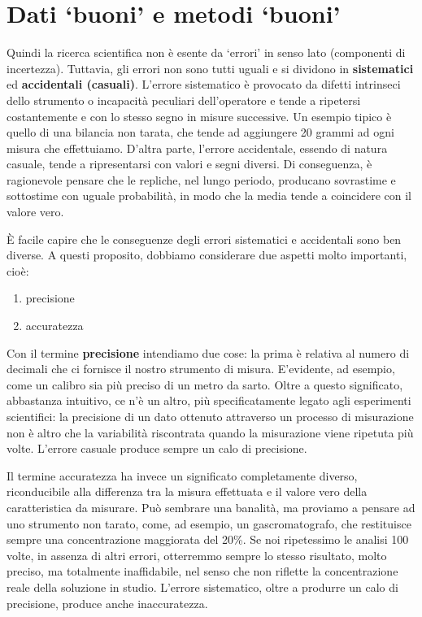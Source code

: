 \documentclass[a4paper,12pt,oneside]{book}
\providecommand{\tightlist}{%
  \setlength{\itemsep}{0pt}\setlength{\parskip}{0pt}}
\begin{document}
\hypertarget{dati-buoni-e-metodi-buoni}{%
\section{Dati `buoni' e metodi `buoni'}\label{dati-buoni-e-metodi-buoni}}

Quindi la ricerca scientifica non è esente da `errori' in senso lato (componenti di incertezza). Tuttavia, gli errori non sono tutti uguali e si dividono in \textbf{sistematici} ed \textbf{accidentali (casuali)}. L'errore sistematico è provocato da difetti intrinseci dello strumento o incapacità peculiari dell'operatore e tende a ripetersi costantemente e con lo stesso segno in misure successive. Un esempio tipico è quello di una bilancia non tarata, che tende ad aggiungere 20 grammi ad ogni misura che effettuiamo. D'altra parte, l'errore accidentale, essendo di natura casuale, tende a ripresentarsi con valori e segni diversi. Di conseguenza, è ragionevole pensare che le repliche, nel lungo periodo, producano sovrastime e sottostime con uguale probabilità, in modo che la media tende a coincidere con il valore vero.

È facile capire che le conseguenze degli errori sistematici e accidentali sono ben diverse. A questi proposito, dobbiamo considerare due aspetti molto importanti, cioè:

\begin{enumerate}
\def\labelenumi{\arabic{enumi}.}
\tightlist
\item
  precisione
\item
  accuratezza
\end{enumerate}

Con il termine \textbf{precisione} intendiamo due cose: la prima è relativa al numero di decimali che ci fornisce il nostro strumento di misura. E'evidente, ad esempio, come un calibro sia più preciso di un metro da sarto. Oltre a questo significato, abbastanza intuitivo, ce n'è un altro, più specificatamente legato agli esperimenti scientifici: la precisione di un dato ottenuto attraverso un processo di misurazione non è altro che la variabilità riscontrata quando la misurazione viene ripetuta più volte. L'errore casuale produce sempre un calo di precisione.

Il termine accuratezza ha invece un significato completamente diverso, riconducibile alla differenza tra la misura effettuata e il valore vero della caratteristica da misurare. Può sembrare una banalità, ma proviamo a pensare ad uno strumento non tarato, come, ad esempio, un gascromatografo, che restituisce sempre una concentrazione maggiorata del 20\%. Se noi ripetessimo le analisi 100 volte, in assenza di altri errori, otterremmo sempre lo stesso risultato, molto preciso, ma totalmente inaffidabile, nel senso che non riflette la concentrazione reale della soluzione in studio. L'errore sistematico, oltre a produrre un calo di precisione, produce anche inaccuratezza.
\end{document}
